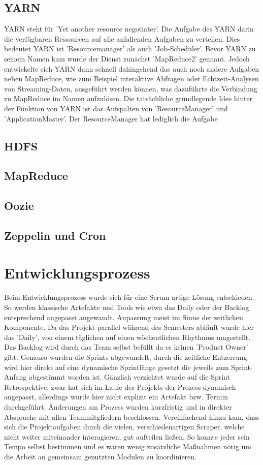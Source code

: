 \documentclass[12pt,twoside,a4paper,parskip]{scrbook}
\begin{document}
\section{YARN}
YARN steht f\"ur 'Yet another resource negotiater'. Die Aufgabe des YARN darin die verf\"ugbaren Ressourcen auf alle anfallenden Aufgaben zu verteilen. Dies bedeutet YARN ist 'Resourcemanager' als auch 'Job-Scheduler'. Bevor YARN zu seinem Namen kam wurde der Dienst zun\"achst 'MapReduce2' gennant. Jedoch entwickelte sich YARN dann schnell dahingehend das auch noch andere Aufgaben neben MapReduce, wie zum Beispiel interaktive Abfragen oder Echtzeit-Analysen von Streaming-Daten, ausgef\"uhrt werden k\"onnen, was dazuf\"uhrte die Verbindung zu MapReduce im Namen aufzul\"osen. \newline
Die tats\"achliche grundlegende Idee hinter der Funktion von YARN ist das Aufspalten von 'ResourceManager' und 'ApplicationMaster'. Der ResourceManager hat lediglich die Aufgabe
\section{HDFS}
\section{MapReduce}
\section{Oozie}
\section{Zeppelin und Cron}

\chapter{Entwicklungsprozess}
Beim Entwicklungsprozess wurde sich f\"ur eine Scrum artige L\"osung entschieden. So werden klassische Artefakte und Tools wie etwa das Daily oder der Backlog entsprechend angepasst angewandt. Anpassung meist im Sinne der zeitlichen Komponente. Da das Projekt parallel w\"ahrend des Semesters abl\"auft wurde hier das 'Daily', von einem t\"aglichen auf einen w\"ochentlichen Rhythmus umgestellt. Das Backlog wird durch das Team selbst bef\"ullt da es keinen 'Product Owner' gibt. Genauso wurden die Sprints abgewandelt, durch die zeitliche Entzerrung wird hier direkt auf eine dynamische Sprintl\"ange gesetzt die jeweils zum Sprint-Anfang abgestimmt worden ist. \newline
G\"anzlich verzichtet wurde auf die Sprint Retrospektive, zwar hat sich im Laufe des Projekts der Prozess dynamisch angepasst, allerdings wurde hier nicht explizit ein Artefakt bzw. Termin durchgef\"uhrt. \"Anderungen am Prozess wurden kurzfristig und in direkter Absprache mit allen Teammitgliedern beschlossen. Vereinfachend hinzu kam, dass sich die Projektaufgaben durch die vielen, verschiedenartigen Scraper, welche nicht weiter miteinander interagieren, gut aufteilen ließen. So konnte jeder sein Tempo selbst bestimmen und es waren wenig zusätzliche Maßnahmen nötig um die Arbeit an gemeinsam genutzten Modulen zu koordinieren.
\end{document}
